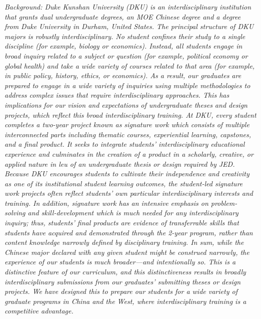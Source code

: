 \documentclass[12pt,a4paper,oneside]{report}
\newcommand{\instructions}[1]{{\color{black}\itshape #1}}
\begin{document}
\instructions{Background:  Duke Kunshan University (DKU) is an interdisciplinary institution that grants dual undergraduate degrees, an MOE Chinese degree and a degree from Duke University in Durham, United States. The principal structure of DKU majors is robustly interdisciplinary. No student confines their study to a single discipline (for example, biology or economics). Instead, all students engage in broad inquiry related to a subject or question (for example, political economy or global health) and take a wide variety of courses related to that area (for example, in public policy, history, ethics, or economics). As a result, our graduates are prepared to engage in a wide variety of inquiries using multiple methodologies to address complex issues that require interdisciplinary approaches.
This has implications for our vision and expectations of undergraduate theses and design projects, which reflect this broad interdisciplinary training. At DKU, every student completes a two-year project known as signature work which consists of multiple interconnected parts including thematic courses, experiential learning, capstones, and a final product. It seeks to integrate students' interdisciplinary educational experience and culminates in the creation of a product in a scholarly, creative, or applied nature in leu of an undergraduate thesis or design required by JED. Because DKU encourages students to cultivate their independence and creativity as one of its institutional student learning outcomes, the student-led signature work projects often reflect students' own particular interdisciplinary interests and training.  In addition, signature work has an intensive emphasis on problem-solving and skill-development which is much needed for any interdisciplinary inquiry; thus, students' final products are evidence of transferrable skills that students have acquired and demonstrated through the 2-year program, rather than content knowledge narrowly defined by disciplinary training.
In sum, while the Chinese major declared with any given student might be construed narrowly, the experience of our students is much broader---and intentionally so.  This is a distinctive feature of our curriculum, and this distinctiveness results in broadly interdisciplinary submissions from our graduates' submitting theses or design projects. We have designed this to prepare our students for a wide variety of graduate programs in China and the West, where interdisciplinary training is a competitive advantage.}
\end{document}
